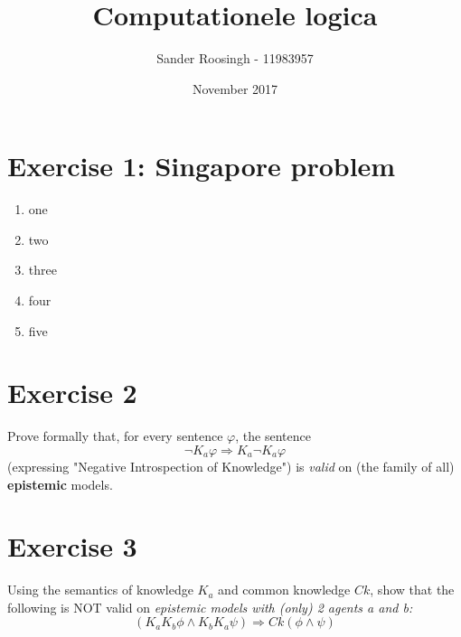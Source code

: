 \documentclass{article}
\title{Computationele logica}
\author{Sander Roosingh - 11983957 }
\date{November 2017}
\begin{document}
\maketitle

\section{Exercise 1: Singapore problem}

\begin{enumerate}[label=(\alph*)]
    \item one
    \item two
    \item three
    \item four
    \item five
\end{enumerate}

\section{Exercise 2}
Prove formally that, for every sentence \(\varphi\), the sentence
\[\neg K_{a}\varphi \Rightarrow K_{a}\neg K_{a}\varphi\]
(expressing "Negative Introspection of Knowledge") is \textit{valid} on (the family of all) \textbf{epistemic} models.

\section{Exercise 3}
Using the semantics of knowledge \(K_{a}\) and common knowledge \(Ck\), show that the following is NOT valid on \textit{epistemic models with (only) 2 agents a and b:}
\[(K_{a}K_{b}\phi\wedge K_{b}K_{a}\psi) \Rightarrow Ck(\phi\wedge\psi)\]
\end{document}
